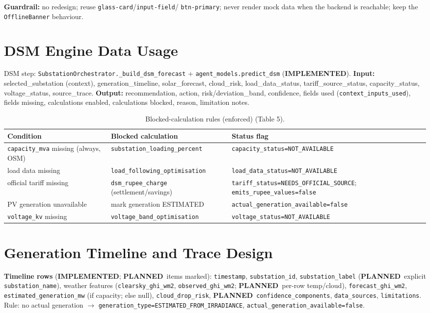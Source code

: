 \documentclass[11pt,a4paper]{article}
\newcommand{\stImpl}{\textcolor{cok}{\textbf{IMPLEMENTED}}}
\newcommand{\stPlan}{\textcolor{cplan}{\textbf{PLANNED}}}
\newcommand{\code}[1]{\texttt{\small #1}}
\begin{document}
\noindent\textbf{Guardrail:} no redesign; reuse \code{glass-card}/\code{input-field}/
\code{btn-primary}; never render mock data when the backend is reachable; keep the
\code{OfflineBanner} behaviour.

\section{DSM Engine Data Usage}
DSM step: \code{SubstationOrchestrator.\_build\_dsm\_forecast} + \code{agent\_models.predict\_dsm}
(\stImpl). \textbf{Input:} selected\_substation (context), generation\_timeline, solar\_forecast,
cloud\_risk, load\_data\_status, tariff\_source\_status, capacity\_status, voltage\_status,
source\_trace. \textbf{Output:} recommendation, action, risk/deviation\_band, confidence, fields
used (\code{context\_inputs\_used}), fields missing, calculations enabled, calculations blocked,
reason, limitation notes.

\begin{table}[H]\centering\footnotesize
\caption{Blocked-calculation rules (enforced) (Table 5).}\label{tab:dsm}
\begin{tabular}{@{}p{4.6cm}p{4.4cm}p{4.6cm}@{}}
\toprule
\textbf{Condition} & \textbf{Blocked calculation} & \textbf{Status flag}\\
\midrule
\code{capacity\_mva} missing (always, OSM) & \code{substation\_loading\_percent} & \code{capacity\_status=NOT\_AVAILABLE}\\
load data missing & \code{load\_following\_optimisation} & \code{load\_data\_status=NOT\_AVAILABLE}\\
official tariff missing & \code{dsm\_rupee\_charge} (settlement/savings) & \code{tariff\_status=NEEDS\_OFFICIAL\_SOURCE}; \code{emits\_rupee\_values=false}\\
PV generation unavailable & mark generation ESTIMATED & \code{actual\_generation\_available=false}\\
\code{voltage\_kv} missing & \code{voltage\_band\_optimisation} & \code{voltage\_status=NOT\_AVAILABLE}\\
\bottomrule
\end{tabular}
\end{table}

\section{Generation Timeline and Trace Design}
\textbf{Timeline rows} (\stImpl; \stPlan\ items marked): \code{timestamp}, \code{substation\_id},
\code{substation\_label} (\stPlan\ explicit \code{substation\_name}), weather features
(\code{clearsky\_ghi\_wm2}, \code{observed\_ghi\_wm2}; \stPlan\ per-row temp/cloud),
\code{forecast\_ghi\_wm2}, \code{estimated\_generation\_mw} (if capacity; else null),
\code{cloud\_drop\_risk}, \stPlan\ \code{confidence\_components}, \code{data\_sources},
\code{limitations}. Rule: no actual generation $\rightarrow$
\code{generation\_type=ESTIMATED\_FROM\_IRRADIANCE}, \code{actual\_generation\_available=false}.
\end{document}
